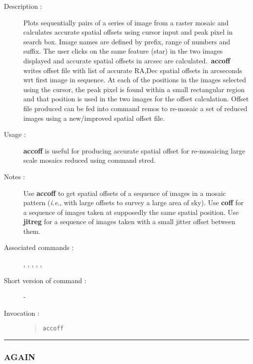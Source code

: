 \begin{description}

\item[Description :] Plots sequentially pairs of a series of image from
a raster mosaic and calculates accurate spatial offsets using cursor
input and peak pixel in search box.  Image names are defined by prefix,
range of numbers and suffix.  The user clicks on the same feature
(star) in the two images displayed and accurate spatial offsets in
arcsec are calculated.\ {\bf accoff} writes offset file with list of
accurate RA,Dec spatial offsets in arcseconds wrt first image in
sequence. At each of the positions in the images selected using the
cursor, the peak pixel is found within a small rectangular region and
that position is used in the two images for the offset calculation.
Offset file produced can be fed into command remos to re-mosaic a set
of reduced images using a new/improved spatial offset file.

\item[Usage :] {\bf accoff} is useful for producing accurate spatial offset for
re-mosaicing large scale mosaics reduced using command stred.

\item[Notes :] Use {\bf accoff} to get spatial offsets of a sequence of images
in a mosaic pattern (\emph{i.e.}, with large offsets to survey a large
area of sky).  Use {\bf coff} for a sequence of images taken at supposedly the
same spatial position. Use {\bf jitreg} for a sequence of images taken with a
small jitter offset between them. 

\item[Associated commands :] {\tt {}}, 
{\tt {}}, {\tt {}}, 
{\tt {}}, {\tt {}}, 
{\tt {}}
\item[Short version of command :] -
\item[Invocation :]

\begin{quote}{\tt accoff }\end{quote}

\end{description}

\hrule
\subsubsection*{\label{AGAIN}AGAIN}

